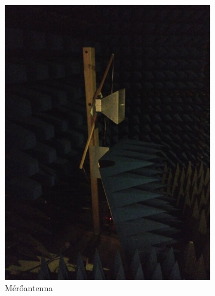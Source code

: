             \begin{figure}
                \centering
                \begin{subfigure}{0.4\textwidth}
                    \includegraphics[width=\textwidth]{kep/szerkesztett/antennaszoba-antenna.jpg}
                    \caption{Mérőantenna}
                \end{subfigure}
                \begin{subfigure}{0.4\textwidth}

\end{subfigure}
\end{figure}
